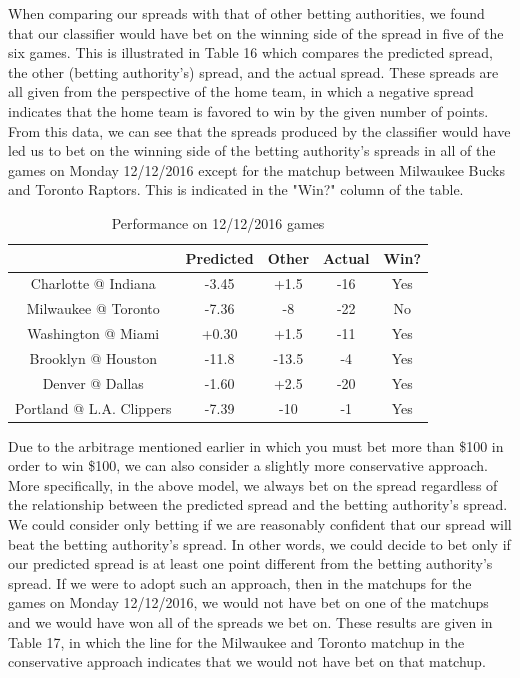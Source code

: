 \documentclass{article}
\begin{document}
When comparing our spreads with that of other betting authorities, we found that our classifier would have bet on the winning side of the spread in five of the six games. This is illustrated in Table 16 which compares the predicted spread, the other (betting authority's) spread, and the actual spread. These spreads are all given from the perspective of the home team, in which a negative spread indicates that the home team is favored to win by the given number of points. From this data, we can see that the spreads produced by the classifier would have led us to bet on the winning side of the betting authority's spreads in all of the games on Monday 12/12/2016 except for the matchup between Milwaukee Bucks and Toronto Raptors. This is indicated in the "Win?" column of the table.


\begin{table}
  \begin{center}
    \begin{tabular}{ | c | c | c | c | c | }
      \hline
                                & Predicted     & Other  & Actual & Win?  \\ \hline
      Charlotte @ Indiana       & -3.45         & +1.5   & -16    & Yes   \\ \hline
      Milwaukee @ Toronto       & -7.36         & -8     & -22    & No   \\ \hline
      Washington @ Miami        & +0.30         & +1.5   & -11    & Yes    \\ \hline
      Brooklyn @ Houston        & -11.8         & -13.5  & -4     & Yes   \\ \hline
      Denver @ Dallas           & -1.60         & +2.5   & -20    & Yes   \\ \hline
      Portland @ L.A. Clippers  & -7.39         & -10    & -1     & Yes   \\ \hline
    \end{tabular}
  \end{center}
  \caption{Performance on 12/12/2016 games}
\end{table}

Due to the arbitrage mentioned earlier in which you must bet more than \$100 in order to win \$100, we can also consider a slightly more conservative approach. More specifically, in the above model, we always bet on the spread regardless of the relationship between the predicted spread and the betting authority's spread. We could consider only betting if we are reasonably confident that our spread will beat the betting authority's spread. In other words, we could decide to bet only if our predicted spread is at least one point different from the betting authority's spread. If we were to adopt such an approach, then in the matchups for the games on Monday 12/12/2016, we would not have bet on one of the matchups and we would have won all of the spreads we bet on. These results are given in Table 17, in which the line for the Milwaukee and Toronto matchup in the conservative approach indicates that we would not have bet on that matchup.
\end{document}
